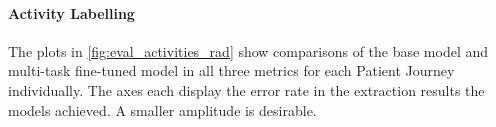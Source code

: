 \paragraph{Activity Labelling} The plots in \autoref{fig:eval_activities_rad} show comparisons of the base model and multi-task fine-tuned model in all three metrics for each Patient Journey individually. The axes each display the error rate in the extraction results the models achieved. A smaller amplitude is desirable.\\
\begin{figure}[h]
  \centering
  \captionsetup{belowskip=0pt,aboveskip=0pt}

\end{figure}
